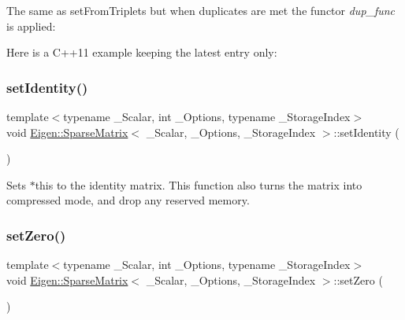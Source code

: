 The same as set\+From\+Triplets but when duplicates are met the functor {\itshape dup\+\_\+func} is applied\+: 
\begin{DoxyCode}{0}
\end{DoxyCode}
 Here is a C++11 example keeping the latest entry only\+: 
\begin{DoxyCode}{0}
\end{DoxyCode}
 \mbox{\label{class_eigen_1_1_sparse_matrix_a89013d2aa58413672c90932607a0d6f0}} 
\subsubsection{\texorpdfstring{setIdentity()}{setIdentity()}}
{\footnotesize\ttfamily template$<$typename \+\_\+\+Scalar, int \+\_\+\+Options, typename \+\_\+\+Storage\+Index$>$ \\
void \mbox{\hyperlink{class_eigen_1_1_sparse_matrix}{Eigen\+::\+Sparse\+Matrix}}$<$ \+\_\+\+Scalar, \+\_\+\+Options, \+\_\+\+Storage\+Index $>$\+::set\+Identity (\begin{DoxyParamCaption}{ }\end{DoxyParamCaption})\hspace{0.3cm}{\ttfamily [inline]}}

Sets $\ast$this to the identity matrix. This function also turns the matrix into compressed mode, and drop any reserved memory. \mbox{\label{class_eigen_1_1_sparse_matrix_ad3c7416090f913e8685523cb3ab7c2f7}} 
\subsubsection{\texorpdfstring{setZero()}{setZero()}}
{\footnotesize\ttfamily template$<$typename \+\_\+\+Scalar, int \+\_\+\+Options, typename \+\_\+\+Storage\+Index$>$ \\
void \mbox{\hyperlink{class_eigen_1_1_sparse_matrix}{Eigen\+::\+Sparse\+Matrix}}$<$ \+\_\+\+Scalar, \+\_\+\+Options, \+\_\+\+Storage\+Index $>$\+::set\+Zero (\begin{DoxyParamCaption}{ }\end{DoxyParamCaption})\hspace{0.3cm}{\ttfamily [inline]}}

